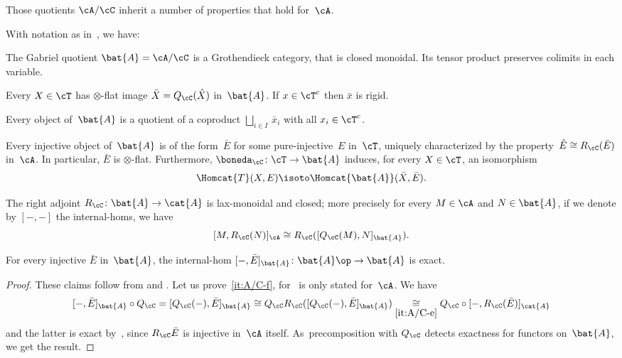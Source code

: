 Those quotients $\cA/\cC$ inherit a number of properties that hold for~$\cA$.
\begin{Prop}
\label{Prop:A/C}
With notation as in~, we have:
\begin{enumeratea}
\item
\label{it:A/C-a}
The Gabriel quotient $\bat{A}=\cA/\cC$ is a Grothendieck category, that is closed monoidal. Its tensor product preserves colimits in each variable.
\item
\label{it:A/C-b}
Every $X\in\cT$ has $\otimes$-flat image $\bar X=Q_\cC(\hat X)$ in~$\bat{A}$. If $x\in \cT^c$ then $\bar x$ is rigid.
\item
\label{it:A/C-c}
Every object of~$\bat{A}$ is a quotient of a coproduct $\bigsqcup_{i\in I}\,\bar x_i$ with all $x_i\in \cT^c$.

\item
\label{it:A/C-d}
Every injective object of~$\bat{A}$ is of the form~$\bar E$ for some pure-injective~$E$ in~$\cT$, uniquely characterized by the property~$\hat E\cong R_\cC(\bar E)$ in~$\cA$. In particular, $\bar E$ is $\otimes$-flat. Furthermore, $\boneda_\cC\colon \cT\to \bat{A}$ induces, for every $X\in\cT$, an isomorphism
\[
\Homcat{T}(X,E)\isoto \Homcat{{\bat{A}}}(\bar X,\bar E).
\]
\item
\label{it:A/C-e}
The right adjoint $R_\cC\colon \bat{A}\to \cat{A}$ is lax-monoidal and closed; more precisely for every $M\in\cA$ and $N\in\bat{A}$, if we denote by $[-,-]$ the internal-homs, we have
\[
[M,R_\cC(N)]_{\cA}\cong R_{\cC}([Q_\cC(M),N]_{\bat{A}}).
\]
\item
\label{it:A/C-f}
For every injective $\bar E$ in~$\bat{A}$, the internal-hom $[-,\bar E]_{\bat{A}}\colon \bat{A}\op\to \bat{A}$ is exact.
\end{enumeratea}
\end{Prop}

\begin{proof}
These claims follow from \cite[App.\,A]{BalmerKrauseStevenson20} and \cite[\S2\,\&\,App.\,A]{BalmerKrauseStevenson19}. Let us prove~\eqref{it:A/C-f}, for~\cite[Lem.\,2.8]{BalmerKrauseStevenson19} is only stated for~$\cA$. We have
\[
[-,\bar E]_{\bat{A}}\circ Q_{\cC}=[Q_{\cC}(-),\bar E]_{\bat{A}}\cong Q_{\cC}R_{\cC}([Q_\cC(-),\bar E]_{\bat{A}})\underset{\eqref{it:A/C-e}}{\cong} Q_{\cC}\circ[-,R_\cC(\bar E)]_{\cat{A}}
\]
and the latter is exact by~\cite[Lem.\,2.8]{BalmerKrauseStevenson19}, since $R_\cC\bar E$ is injective in~$\cA$ itself. As~pre\-composition with $Q_\cC$ detects exactness for functors on~$\bat{A}$, we get the result.
\end{proof}

